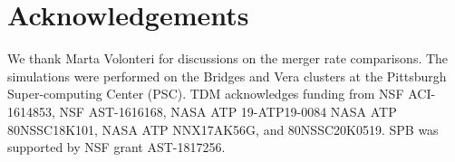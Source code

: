 \documentclass[fleqn,usenatbib]{mnras}
\begin{document}
\section*{Acknowledgements}
We thank Marta Volonteri for discussions on the merger rate comparisons. The simulations were performed on the Bridges and Vera clusters at the Pittsburgh Super-computing Center (PSC). TDM acknowledges funding from NSF ACI-1614853, NSF AST-1616168, NASA ATP 19-ATP19-0084 NASA ATP 80NSSC18K101, NASA ATP NNX17AK56G, and 80NSSC20K0519.
SPB was supported by NSF grant AST-1817256.








\appendix





\bsp	%
\label{lastpage}
\end{document}
